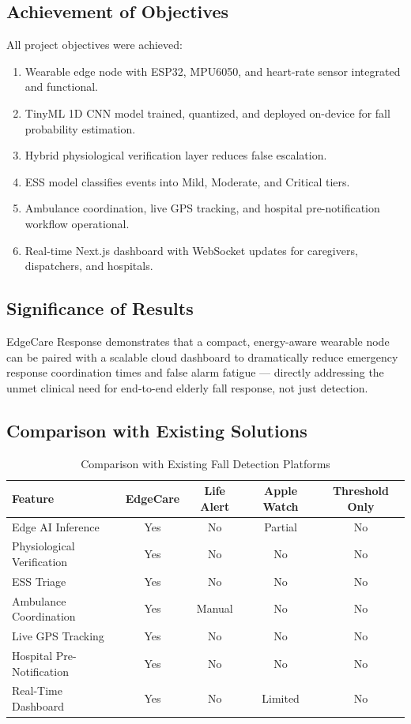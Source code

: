 \subsection{Achievement of Objectives}

All project objectives were achieved:
\begin{enumerate}
\item Wearable edge node with ESP32, MPU6050, and heart-rate sensor integrated and functional.
\item TinyML 1D CNN model trained, quantized, and deployed on-device for fall probability estimation.
\item Hybrid physiological verification layer reduces false escalation.
\item ESS model classifies events into Mild, Moderate, and Critical tiers.
\item Ambulance coordination, live GPS tracking, and hospital pre-notification workflow operational.
\item Real-time Next.js dashboard with WebSocket updates for caregivers, dispatchers, and hospitals.
\end{enumerate}

\subsection{Significance of Results}

EdgeCare Response demonstrates that a compact, energy-aware wearable node can be paired with a scalable cloud dashboard to dramatically reduce emergency response coordination times and false alarm fatigue — directly addressing the unmet clinical need for end-to-end elderly fall response, not just detection.

\subsection{Comparison with Existing Solutions}

\begin{table}[htb]
\fontsize{10}{12}\selectfont
\caption{Comparison with Existing Fall Detection Platforms}
\label{tab:comparison}
\centering
\begin{tabular}{|p{3.8cm}|c|c|c|c|}
	\hline
	\textbf{Feature} & \textbf{EdgeCare} & \textbf{Life Alert} & \textbf{Apple Watch} & \textbf{Threshold Only} \\
	\hline
	Edge AI Inference & Yes & No & Partial & No \\
	\hline
	Physiological Verification & Yes & No & No & No \\
	\hline
	ESS Triage & Yes & No & No & No \\
	\hline
	Ambulance Coordination & Yes & Manual & No & No \\
	\hline
	Live GPS Tracking & Yes & No & No & No \\
	\hline
	Hospital Pre-Notification & Yes & No & No & No \\
	\hline
	Real-Time Dashboard & Yes & No & Limited & No \\
	\hline
\end{tabular}
\end{table}

